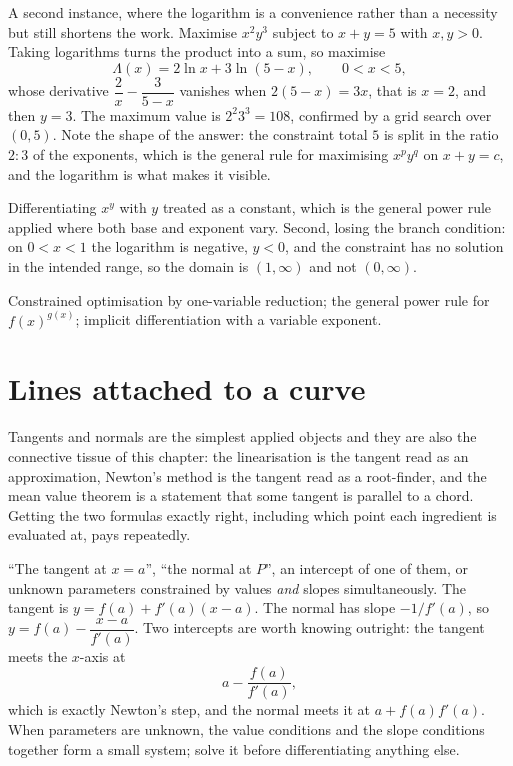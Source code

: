 A second instance, where the logarithm is a convenience rather than a necessity but still shortens the work. Maximise $x^{2}y^{3}$ subject to $x+y=5$ with $x,y>0$. Taking logarithms turns the product into a sum, so maximise
\[
\Lambda(x)=2\ln x+3\ln(5-x),\qquad 0<x<5 ,
\]
whose derivative $\dfrac2x-\dfrac{3}{5-x}$ vanishes when $2(5-x)=3x$, that is $x=2$, and then $y=3$. The maximum value is $2^{2}3^{3}=108$, confirmed by a grid search over $(0,5)$. Note the shape of the answer: the constraint total $5$ is split in the ratio $2:3$ of the exponents, which is the general rule for maximising $x^{p}y^{q}$ on $x+y=c$, and the logarithm is what makes it visible.

\begin{trap}
Differentiating $x^{y}$ with $y$ treated as a constant, which is the general power rule applied where both base and exponent vary. Second, losing the branch condition: on $0<x<1$ the logarithm is negative, $y<0$, and the constraint has no solution in the intended range, so the domain is $(1,\infty)$ and not $(0,\infty)$.
\end{trap}

\begin{seealsob}Constrained optimisation by one-variable reduction; the general power rule for $f(x)^{g(x)}$; implicit differentiation with a variable exponent.\end{seealsob}

\section{Lines attached to a curve}

Tangents and normals are the simplest applied objects and they are also the connective tissue of this chapter: the linearisation is the tangent read as an approximation, Newton's method is the tangent read as a root-finder, and the mean value theorem is a statement that some tangent is parallel to a chord. Getting the two formulas exactly right, including which point each ingredient is evaluated at, pays repeatedly.

\cue ``The tangent at $x=a$'', ``the normal at $P$'', an intercept of one of them, or unknown parameters constrained by values \emph{and} slopes simultaneously.
\method The tangent is $y=f(a)+f'(a)(x-a)$. The normal has slope $-1/f'(a)$, so $y=f(a)-\dfrac{x-a}{f'(a)}$. Two intercepts are worth knowing outright: the tangent meets the $x$-axis at
\[
a-\frac{f(a)}{f'(a)},
\]
which is exactly Newton's step, and the normal meets it at $a+f(a)f'(a)$. When parameters are unknown, the value conditions and the slope conditions together form a small system; solve it before differentiating anything else.

